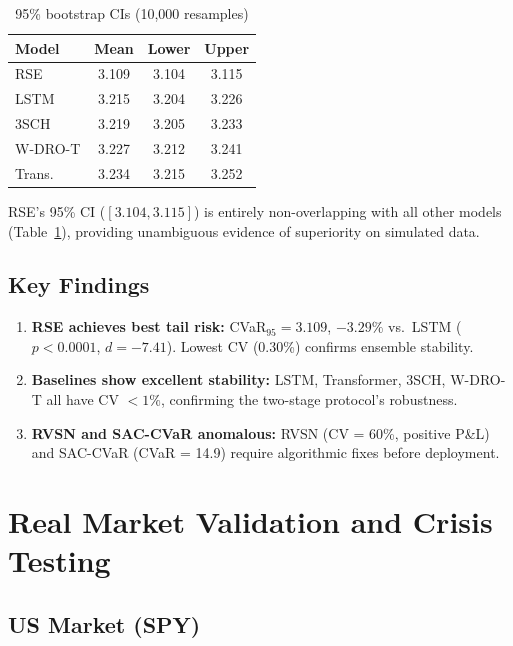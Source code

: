 \documentclass[11pt]{article}
\begin{document}
\begin{table}[t]
\centering
\caption{95\% bootstrap CIs (10,000 resamples)}
\label{tab:bootstrap}
\small
\begin{tabular}{lccc}
\toprule
\textbf{Model} & \textbf{Mean} & \textbf{Lower} & \textbf{Upper} \\
\midrule
RSE & 3.109 & 3.104 & 3.115 \\
LSTM & 3.215 & 3.204 & 3.226 \\
3SCH & 3.219 & 3.205 & 3.233 \\
W-DRO-T & 3.227 & 3.212 & 3.241 \\
Trans. & 3.234 & 3.215 & 3.252 \\
\bottomrule
\end{tabular}
\end{table}

RSE's 95\% CI ($[3.104, 3.115]$) is entirely non-overlapping with all other models (Table~\ref{tab:bootstrap}), providing unambiguous evidence of superiority on simulated data.

\subsection{Key Findings}

\begin{enumerate}[noitemsep,leftmargin=*]
    \item \textbf{RSE achieves best tail risk:} CVaR$_{95} = 3.109$, $-3.29\%$ vs.\ LSTM ($p < 0.0001$, $d = -7.41$). Lowest CV (0.30\%) confirms ensemble stability.
    \item \textbf{Baselines show excellent stability:} LSTM, Transformer, 3SCH, W-DRO-T all have CV $< 1\%$, confirming the two-stage protocol's robustness.
    \item \textbf{RVSN and SAC-CVaR anomalous:} RVSN (CV = 60\%, positive P\&L) and SAC-CVaR (CVaR = 14.9) require algorithmic fixes before deployment.
\end{enumerate}

\section{Real Market Validation and Crisis Testing}
\label{sec:crisis}

\subsection{US Market (SPY)}
\end{document}
